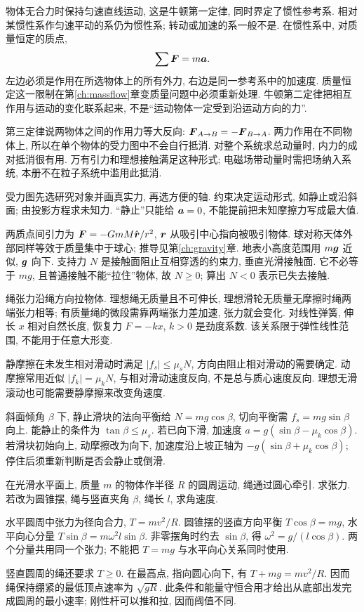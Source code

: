 \label{ch:newton}
物体无合力时保持匀速直线运动, 这是牛顿第一定律, 同时界定了惯性参考系. 相对某惯性系作匀速平动的系仍为惯性系; 转动或加速的系一般不是. 在惯性系中, 对质量恒定的质点,
\begin{equation}
\sum\boldsymbol{F}=m\boldsymbol{a}.
\end{equation}
左边必须是作用在所选物体上的所有外力, 右边是同一参考系中的加速度. 质量恒定这一限制在第\ref{ch:massflow}章变质量问题中必须重新处理. 牛顿第二定律把相互作用与运动的变化联系起来, 不是“运动物体一定受到沿运动方向的力”.

第三定律说两物体之间的作用力等大反向: $\boldsymbol{F}_{A\to B}=-\boldsymbol{F}_{B\to A}$. 两力作用在不同物体上, 所以在单个物体的受力图中不会自行抵消. 对整个系统求总动量时, 内力的成对抵消很有用. 万有引力和理想接触满足这种形式; 电磁场带动量时需把场纳入系统, 本册不在粒子系统中滥用此抵消.

受力图先选研究对象并画真实力, 再选方便的轴. 约束决定运动形式, 如静止或沿斜面; 由投影方程求未知力. “静止”只能给 $\boldsymbol{a}=0$, 不能提前把未知摩擦力写成最大值.

两质点间引力为 $\boldsymbol{F}=-GmM\hat{\boldsymbol{r}}/r^2$, $\boldsymbol{r}$ 从吸引中心指向被吸引物体. 球对称天体外部同样等效于质量集中于球心; 推导见第\ref{ch:gravity}章. 地表小高度范围用 $m\boldsymbol{g}$ 近似, $\boldsymbol{g}$ 向下. 支持力 $N$ 是接触面阻止互相穿透的约束力, 垂直光滑接触面. 它不必等于 $mg$, 且普通接触不能“拉住”物体, 故 $N\ge0$; 算出 $N<0$ 表示已失去接触.

绳张力沿绳方向拉物体. 理想绳无质量且不可伸长, 理想滑轮无质量无摩擦时绳两端张力相等; 有质量绳的微段需靠两端张力差加速, 张力就会变化. 对线性弹簧, 伸长 $x$ 相对自然长度, 恢复力 $F=-kx$, $k>0$ 是劲度系数. 该关系限于弹性线性范围, 不能用于任意大形变.

静摩擦在未发生相对滑动时满足 $|f_s|\le\mu_sN$, 方向由阻止相对滑动的需要确定. 动摩擦常用近似 $|f_k|=\mu_kN$, 与相对滑动速度反向, 不是总与质心速度反向. 理想无滑滚动也可能需要静摩擦来改变角速度.

斜面倾角 $\beta$ 下, 静止滑块的法向平衡给 $N=mg\cos\beta$, 切向平衡需 $f_s=mg\sin\beta$ 向上. 能静止的条件为 $\tan\beta\le\mu_s$. 若已向下滑, 加速度 $a=g(\sin\beta-\mu_k\cos\beta)$. 若滑块初始向上, 动摩擦改为向下, 加速度沿上坡正轴为 $-g(\sin\beta+\mu_k\cos\beta)$; 停住后须重新判断是否会静止或倒滑.

\begin{example}
在光滑水平面上, 质量 $m$ 的物体作半径 $R$ 的圆周运动, 绳通过圆心牵引. 求张力. 若改为圆锥摆, 绳与竖直夹角 $\beta$, 绳长 $l$, 求角速度.
\end{example}
\begin{solution}
水平圆周中张力为径向合力, $T=mv^2/R$. 圆锥摆的竖直方向平衡 $T\cos\beta=mg$, 水平向心分量 $T\sin\beta=m\omega^2l\sin\beta$. 非零摆角时约去 $\sin\beta$, 得 $\omega^2=g/(l\cos\beta)$. 两个分量共用同一个张力; 不能把 $T=mg$ 与水平向心关系同时使用.
\end{solution}
竖直圆周的绳还要求 $T\ge0$. 在最高点, 指向圆心向下, 有 $T+mg=mv^2/R$. 因而绳保持绷紧的最低顶点速率为 $\sqrt{gR}$. 此条件和能量守恒合用才给出从底部出发完成圆周的最小速率; 刚性杆可以推和拉, 因而阈值不同.

